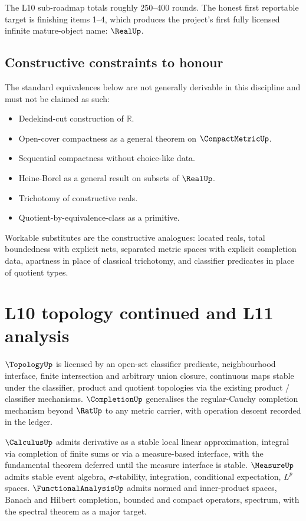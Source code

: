 The L10 sub-roadmap totals roughly $250$--$400$ rounds. The honest first reportable target is finishing items 1--4, which produces the project's first fully licensed infinite mature-object name: $\RealUp$.

\subsection*{Constructive constraints to honour}
\label{sec:roadmap-l10-constructive-constraints}

The standard equivalences below are not generally derivable in this discipline and must not be claimed as such:
\begin{itemize}
  \item Dedekind-cut construction of $\mathbb{R}$.
  \item Open-cover compactness as a general theorem on $\CompactMetricUp$.
  \item Sequential compactness without choice-like data.
  \item Heine-Borel as a general result on subsets of $\RealUp$.
  \item Trichotomy of constructive reals.
  \item Quotient-by-equivalence-class as a primitive.
\end{itemize}
Workable substitutes are the constructive analogues: located reals, total boundedness with explicit nets, separated metric spaces with explicit completion data, apartness in place of classical trichotomy, and classifier predicates in place of quotient types.

\section{L10 topology continued and L11 analysis}
\label{sec:roadmap-l11-analysis}

$\TopologyUp$ is licensed by an open-set classifier predicate, neighbourhood interface, finite intersection and arbitrary union closure, continuous maps stable under the classifier, product and quotient topologies via the existing product / classifier mechanisms. $\CompletionUp$ generalises the regular-Cauchy completion mechanism beyond $\RatUp$ to any metric carrier, with operation descent recorded in the ledger.

$\CalculusUp$ admits derivative as a stable local linear approximation, integral via completion of finite sums or via a measure-based interface, with the fundamental theorem deferred until the measure interface is stable. $\MeasureUp$ admits stable event algebra, $\sigma$-stability, integration, conditional expectation, $L^p$ spaces. $\FunctionalAnalysisUp$ admits normed and inner-product spaces, Banach and Hilbert completion, bounded and compact operators, spectrum, with the spectral theorem as a major target.

